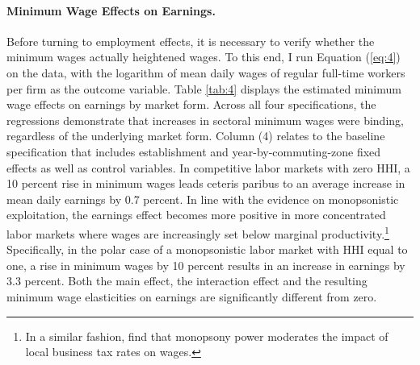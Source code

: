 \documentclass[11pt,oneside,reqno,xcolor=dvipsnames]{article} %
\begin{document}
\paragraph{Minimum Wage Effects on Earnings.} Before turning to employment effects, it is necessary to verify whether the minimum wages actually heightened wages. To this end, I run Equation (\ref{eq:4}) on the data, with the logarithm of mean daily wages of regular full-time workers per firm as the outcome variable. Table \ref{tab:4} displays the estimated minimum wage effects on earnings by market form. Across all four specifications, the regressions demonstrate that increases in sectoral minimum wages were binding, regardless of the underlying market form. Column (4) relates to the baseline specification that includes establishment and year-by-commuting-zone fixed effects as well as control variables. In competitive labor markets with zero HHI, a 10 percent rise in minimum wages leads ceteris paribus to an average increase in mean daily earnings by 0.7 percent. In line with the evidence on monopsonistic exploitation, the earnings effect becomes more positive in more concentrated labor markets where wages are increasingly set below marginal productivity.\footnote{In a similar fashion, \citet{FuestEtAl2018} find that monopsony power moderates the impact of local business tax rates on wages.} Specifically, in the polar case of a monopsonistic labor market with HHI equal to one, a rise in minimum wages by 10 percent results in an increase in earnings by 3.3 percent. Both the main effect, the interaction effect and the resulting minimum wage elasticities on earnings are significantly different from zero.
\end{document}
